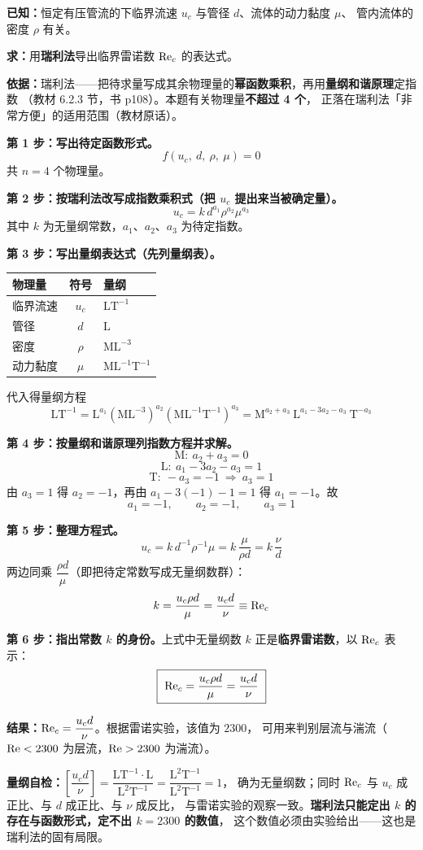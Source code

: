 \begin{jie}
\textbf{已知：}恒定有压管流的下临界流速 $u_c$ 与管径 $d$、流体的动力黏度 $\mu$、
管内流体的密度 $\rho$ 有关。

\textbf{求：}用\textbf{瑞利法}导出临界雷诺数 $\mathrm{Re}_c$ 的表达式。

\textbf{依据：}瑞利法——把待求量写成其余物理量的\textbf{幂函数乘积}，再用\textbf{量纲和谐原理}定指数
（教材 6.2.3 节，书 p108）。本题有关物理量\textbf{不超过 4 个}，
正落在瑞利法「非常方便」的适用范围（教材原话）。

\textbf{第 1 步：写出待定函数形式。}
\[ f(u_c,\ d,\ \rho,\ \mu)=0 \]
共 $n=4$ 个物理量。

\textbf{第 2 步：按瑞利法改写成指数乘积式（把 $u_c$ 提出来当被确定量）。}
\[ u_c=k\,d^{a_1}\rho^{a_2}\mu^{a_3} \]
其中 $k$ 为无量纲常数，$a_1$、$a_2$、$a_3$ 为待定指数。

\textbf{第 3 步：写出量纲表达式（先列量纲表）。}

\begin{center}
\begin{tabularx}{\textwidth}{@{}lcX@{}}
\toprule
物理量 & 符号 & 量纲 \\
\midrule
临界流速 & $u_c$ & $\mathrm{LT^{-1}}$ \\
管径 & $d$ & $\mathrm{L}$ \\
密度 & $\rho$ & $\mathrm{ML^{-3}}$ \\
动力黏度 & $\mu$ & $\mathrm{ML^{-1}T^{-1}}$ \\
\bottomrule
\end{tabularx}
\end{center}

代入得量纲方程
\[ \mathrm{LT^{-1}}
   =\mathrm{L}^{a_1}\left(\mathrm{ML^{-3}}\right)^{a_2}
      \left(\mathrm{ML^{-1}T^{-1}}\right)^{a_3}
   =\mathrm{M}^{a_2+a_3}\ \mathrm{L}^{a_1-3a_2-a_3}\ \mathrm{T}^{-a_3} \]

\textbf{第 4 步：按量纲和谐原理列指数方程并求解。}
\[ \mathrm{M}:\ a_2+a_3=0 \]
\[ \mathrm{L}:\ a_1-3a_2-a_3=1 \]
\[ \mathrm{T}:\ -a_3=-1\ \Longrightarrow\ a_3=1 \]
由 $a_3=1$ 得 $a_2=-1$，再由 $a_1-3(-1)-1=1$ 得 $a_1=-1$。故
\[ a_1=-1,\qquad a_2=-1,\qquad a_3=1 \]

\textbf{第 5 步：整理方程式。}
\[ u_c=k\,d^{-1}\rho^{-1}\mu=k\,\frac{\mu}{\rho d}
   =k\,\frac{\nu}{d} \]
两边同乘 $\dfrac{\rho d}{\mu}$（即把待定常数写成无量纲数群）：
\[ k=\frac{u_c\rho d}{\mu}=\frac{u_c d}{\nu}\equiv\mathrm{Re}_c \]

\textbf{第 6 步：指出常数 $k$ 的身份。}上式中无量纲数 $k$ 正是\textbf{临界雷诺数}，以 $\mathrm{Re}_c$ 表示：
\[ \boxed{\ \mathrm{Re}_c=\frac{u_c\rho d}{\mu}=\frac{u_c d}{\nu}\ } \]

\textbf{结果：}$\mathrm{Re}_c=\dfrac{u_c d}{\nu}$。根据雷诺实验，该值为 $2300$，
可用来判别层流与湍流（$\mathrm{Re}<2300$ 为层流，$\mathrm{Re}>2300$ 为湍流）。

\textbf{量纲自检：}$\left[\dfrac{u_c d}{\nu}\right]
=\dfrac{\mathrm{LT^{-1}}\cdot\mathrm{L}}{\mathrm{L^{2}T^{-1}}}
=\dfrac{\mathrm{L^{2}T^{-1}}}{\mathrm{L^{2}T^{-1}}}=1$，
确为无量纲数；同时 $\mathrm{Re}_c$ 与 $u_c$ 成正比、与 $d$ 成正比、与 $\nu$ 成反比，
与雷诺实验的观察一致。\textbf{瑞利法只能定出 $k$ 的存在与函数形式，定不出 $k=2300$ 的数值}，
这个数值必须由实验给出——这也是瑞利法的固有局限。
\end{jie}

